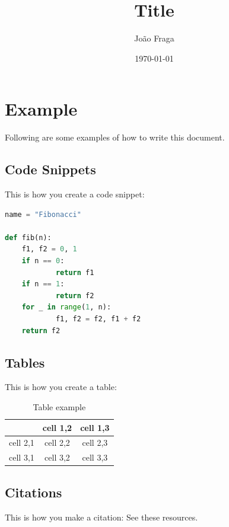 \documentclass[a4paper]{article}
\title{Title}
\author{João Fraga}
\date{\today}
\begin{document}
\maketitle

\section{Example}\label{sec:examplecontent}

Following are some examples of how to write this document.

\subsection{Code Snippets}\label{subsec:codesnippets}

This is how you create a code snippet:

\begin{lstlisting}[language=Python, caption=fibonacci]
name = "Fibonacci"

def fib(n):
	f1, f2 = 0, 1
	if n == 0:
			return f1
	if n == 1:
			return f2
	for _ in range(1, n):
			f1, f2 = f2, f1 + f2
	return f2
\end{lstlisting}

\subsection{Tables}\label{subsec:tables}

This is how you create a table:

\begin{table}[H]
	\begin{center}
		\begin{tabular}{ | c || c | c | }
			\hline
			 & cell 1,2 & cell 1,3 \\
			\hline
			\hline
			cell 2,1 & cell 2,2 & cell 2,3 \\
			cell 3,1 & cell 3,2 & cell 3,3 \\
			\hline
		\end{tabular}
		\caption{Table example}\label{tbl:tableexample}
	\end{center}
\end{table}

\subsection{Citations}\label{subsec:citations}

This is how you make a citation: See these resources\cite{wiki:latex, slides}.
\end{document}
